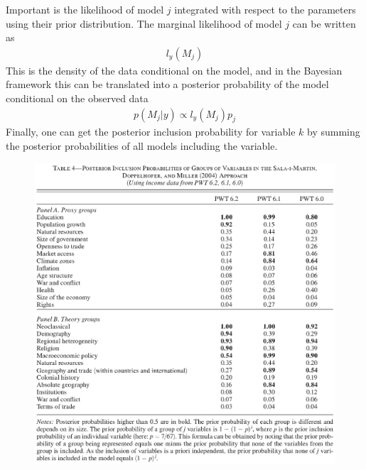 \documentclass{beamer}
\begin{document}
\begin{frame}
  Important is the likelihood of model $j$ integrated with respect to the parameters using their prior distribution.
  The marginal likelihood of model $j$ can be written as
  \begin{align}
    l_y(M_j)
  \end{align}
  This is the density of the data conditional on the model, and in the Bayesian framework this can be translated into a posterior probability of the model conditional on the observed data
  \begin{align}
    p(M_j|y) \propto l_y(M_j)p_j
  \end{align}
  \medskip
  Finally, one can get the posterior inclusion probability for variable $k$ by summing the posterior probabilities of all models including the variable.
\end{frame}

\begin{frame}
  \begin{figure}
    \includegraphics[scale=.5]{ciccone.eps}
  \end{figure}
\end{frame}
\end{document}
